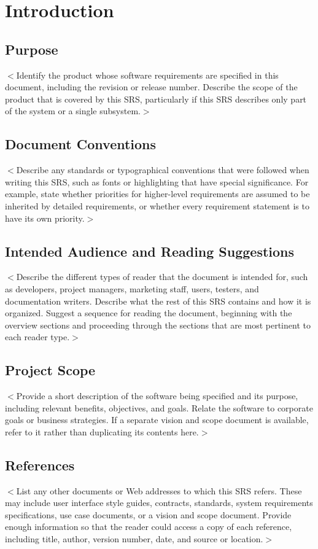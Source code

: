 \documentclass[a4paper, 11pt]{scrreprt}
\begin{document}
\chapter{Introduction}

\section{Purpose}
$<$Identify the product whose software requirements are specified in this 
document, including the revision or release number. Describe the scope of the 
product that is covered by this SRS, particularly if this SRS describes only 
part of the system or a single subsystem.$>$

\section{Document Conventions}
$<$Describe any standards or typographical conventions that were followed when 
writing this SRS, such as fonts or highlighting that have special significance.  
For example, state whether priorities  for higher-level requirements are assumed 
to be inherited by detailed requirements, or whether every requirement statement 
is to have its own priority.$>$

\section{Intended Audience and Reading Suggestions}
$<$Describe the different types of reader that the document is intended for, 
such as developers, project managers, marketing staff, users, testers, and 
documentation writers. Describe what the rest of this SRS contains and how it is 
organized. Suggest a sequence for reading the document, beginning with the 
overview sections and proceeding through the sections that are most pertinent to 
each reader type.$>$

\section{Project Scope}
$<$Provide a short description of the software being specified and its purpose, 
including relevant benefits, objectives, and goals. Relate the software to 
corporate goals or business strategies. If a separate vision and scope document 
is available, refer to it rather than duplicating its contents here.$>$

\section{References}
$<$List any other documents or Web addresses to which this SRS refers. These may 
include user interface style guides, contracts, standards, system requirements 
specifications, use case documents, or a vision and scope document. Provide 
enough information so that the reader could access a copy of each reference, 
including title, author, version number, date, and source or location.$>$
\end{document}
